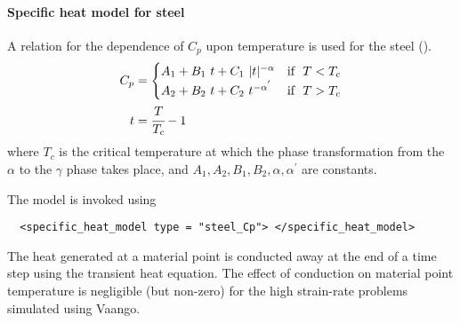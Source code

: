   \paragraph{Specific heat model for steel}
  A relation for the dependence of $C_p$ upon temperature is
  used for the steel (\cite{Lederman1974}).
  \begin{align}
    C_p & = \begin{cases}
            A_1 + B_1~t + C_1~|t|^{-\alpha} & \text{if}~~ T < T_c \\
            A_2 + B_2~t + C_2~t^{-\alpha^{'}} & \text{if}~~ T > T_c 
          \end{cases} \label{eq:CpSteel}\\
    t & = \cfrac{T}{T_c} - 1 
  \end{align}
  where $T_c$ is the critical temperature at which the phase transformation
  from the $\alpha$ to the $\gamma$ phase takes place, and $A_1, A_2, B_1, B_2,
  \alpha, \alpha^{'}$ are constants.

  The model is invoked using
  \lstset{language=XML}
  \begin{lstlisting}
  <specific_heat_model type = "steel_Cp"> </specific_heat_model>
  \end{lstlisting}

  The heat generated at a material point is conducted away at the end of a 
  time step using the transient heat equation.  The effect of conduction on
  material point temperature is negligible (but non-zero) for the high 
  strain-rate problems simulated using Vaango.

